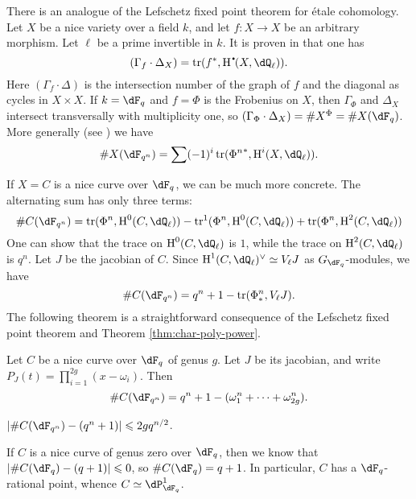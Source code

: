 There is an analogue of the Lefschetz fixed point theorem for \'etale 
cohomology. Let $X$ be a nice variety over a field $k$, and let 
$f:X\to X$ be an arbitrary morphism. Let $\ell$ be a prime invertible in $k$. 
It is proven in \cite[IV.3.3]{de77} that one has 
\[
  (\Gamma_f \cdot \Delta_X) = \trace(f^\ast,\h^\bullet(X,\dQ_\ell))\text{.}
\]
Here $(\Gamma_f\cdot \Delta)$ is the intersection number of the graph of $f$ 
and the diagonal as cycles in $X\times X$. If $k=\dF_q$ and $f=\Phi$ is the 
Frobenius on $X$, then $\Gamma_\Phi$ and $\Delta_X$ intersect transversally 
with multiplicity one, so 
$(\Gamma_\Phi\cdot \Delta_X)=\# X^\Phi=\# X(\dF_q)$. More generally (see 
\cite[IV.3.7]{de77}) we have
\[
  \# X(\dF_{q^n}) = \sum (-1)^i \trace({\Phi^n}^\ast, \h^i(X,\dQ_\ell)) \text{.}
\]

If $X=C$ is a nice curve over $\dF_q$, we can be much more concrete. The 
alternating sum has only three terms:
\[
  \# C(\dF_{q^n}) = \trace(\Phi^n,\h^0(C,\dQ_\ell)) - \trace^1(\Phi^n,\h^0(C,\dQ_\ell)) + \trace(\Phi^n,\h^2(C,\dQ_\ell))
\]
One can show that the trace on $\h^0(C,\dQ_\ell)$ is $1$, while the trace on 
$\h^2(C,\dQ_\ell)$ is $q^n$. Let $J$ be the jacobian of $C$. Since 
$\h^1(C,\dQ_\ell)^\vee \simeq V_\ell J$ as $G_{\dF_q}$-modules, we have 
\[
  \# C(\dF_{q^n}) = q^n+1 - \trace(\Phi_\ast^n, V_\ell J) \text{.}
\]
The following theorem is a straightforward consequence of the Lefschetz fixed 
point theorem and Theorem \ref{thm:char-poly-power}. 

\begin{theorem}\label{thm:weil-curve}
Let $C$ be a nice curve over $\dF_q$ of genus $g$. Let $J$ be its jacobian, and 
write $P_J(t) = \prod_{i=1}^{2 g} (x-\omega_i)$. Then 
\[
  \# C(\dF_{q^n}) = q^n+1 - (\omega_1^n + \cdots + \omega_{2 g}^n) \text{.}
\]
\end{theorem}

\begin{corollary}
$|\# C(\dF_{q^n}) - (q^n+1)| \leqslant 2 g q^{n/2}$.
\end{corollary}






\begin{example}
If $C$ is a nice curve of genus zero over $\dF_q$, then we know that 
$|\# C(\dF_q) - (q+1)| \leqslant 0$, so $\# C(\dF_q) = q+1$. In particular, 
$C$ has a $\dF_q$-rational point, whence $C\simeq \dP_{\dF_q}^1$. 
\end{example}

